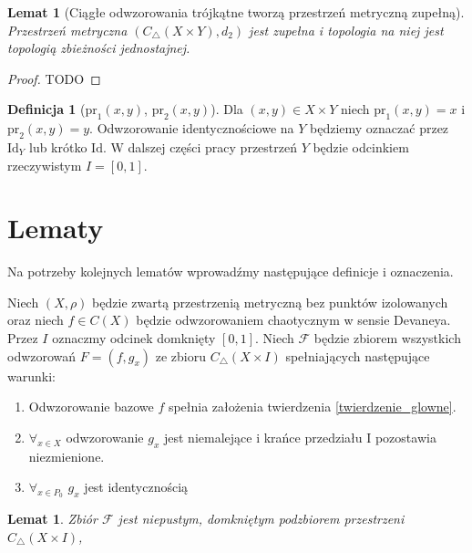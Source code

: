 \documentclass[licencjacka]{pwr_wmat_praca_dyplomowa}
\theoremstyle{plain}
\numberwithin{theorem}{chapter}
\newtheorem{lemma}[theorem]{Lemat}
\theoremstyle{definition}
\numberwithin{theorem}{chapter}
\newtheorem{definition}[theorem]{Definicja}
\begin{document}
\begin{lemma}[Ciągłe odwzorowania trójkątne tworzą przestrzeń metryczną zupełną]
\label{ciagle_trojkatne_tworza_przestrzen_metryczna_zupelna}
Przestrzeń metryczna $(C_\triangle(X \times Y), d_2)$ jest zupełna i topologia na niej jest topologią zbieżności jednostajnej.
\end{lemma}

\begin{proof}
TODO
\end{proof}


\begin{definition}[$\textrm{pr}_1(x, y)$, $\textrm{pr}_2(x, y)$]
Dla $(x, y) \in X \times Y$ niech $\textrm{pr}_1(x, y) = x$ i $\textrm{pr}_2(x, y) = y$. Odwzorowanie identycznościowe na $Y$ będziemy oznaczać przez $\textrm{Id}_Y$ lub krótko $\textrm{Id}$. W dalszej części pracy przestrzeń $Y$ będzie odcinkiem rzeczywistym $I = [0, 1]$.
\end{definition}





\section{Lematy}

Na potrzeby kolejnych lematów wprowadźmy następujące definicje i oznaczenia.

Niech $(X, \rho)$ będzie zwartą przestrzenią metryczną bez punktów izolowanych oraz niech $f \in C(X)$ będzie odwzorowaniem chaotycznym w sensie Devaneya.
Przez $I$ oznaczmy odcinek domknięty $[0, 1].$
Niech $\mathcal{F}$ będzie zbiorem wszystkich odwzorowań $F = (f, g_x)$ ze zbioru $C_\triangle(X \times I)$ spełniających następujące warunki:
\begin{enumerate}
\item Odwzorowanie bazowe $f$ spełnia założenia twierdzenia \ref{twierdzenie_glowne}.
\item $\forall_{x \in X}$ odwzorowanie $g_x$ jest niemalejące i krańce przedziału I pozostawia niezmienione.
\item $\forall_{x \in P_0}$ $g_x$ jest identycznością 
\end{enumerate}


\begin{lemma} \label{F_jest_niepustym_domknietym_podzbiorem_trojkatnych}
Zbiór $\mathcal{F}$ jest niepustym, domkniętym podzbiorem przestrzeni $C_{\triangle}(X \times I)$, 
\end{lemma}
\end{document}
